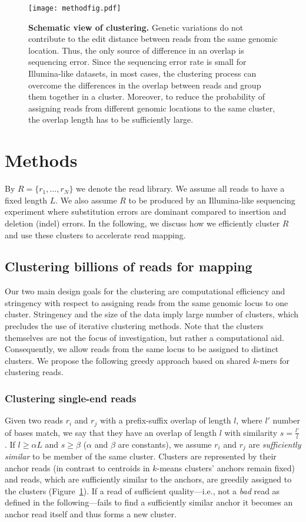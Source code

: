 \documentclass[a4paper]{article}
\begin{document}
\begin{figure}
\centering
\texttt{[image: methodfig.pdf]}
\caption{\label{fig:method}
{\bf Schematic view of clustering.}
Genetic variations do not contribute to the edit distance between reads from the same genomic
location. Thus, the only source of difference in an overlap is sequencing error. Since the sequencing
error rate is small for Illumina-like datasets, in most cases, the clustering process can overcome
the differences in the overlap between reads and group them together in a cluster. Moreover, to
reduce the probability of assigning reads from different genomic locations to the same cluster,
the overlap length has to be sufficiently large.}
\vspace{-4mm}
\end{figure}




\section{Methods}
By $R = \{r_1, \ldots, r_N\}$ we denote the read library.
We assume all reads to have a fixed length $L$.
We also assume $R$ to be produced by an Illumina-like sequencing experiment where
substitution errors are dominant compared to insertion and deletion (indel)
errors. In the following, we discuss how we efficiently cluster $R$
and use these clusters to accelerate read mapping.

\subsection{Clustering billions of reads for mapping}
\label{clustering}
Our two main design goals for the clustering are computational efficiency
and stringency with respect to
assigning reads from the same genomic locus
to one cluster. Stringency and the size of the data imply large number of
clusters, which precludes the use of iterative clustering methods. Note
that the clusters themselves are not the focus of investigation, but rather a
computational aid. Consequently, we allow reads from the same locus to be
assigned to distinct clusters. We propose the following greedy approach based
on shared $k$-mers for clustering reads.

\subsubsection{Clustering single-end reads}
Given two reads $r_i$ and $r_j$ with a prefix-suffix overlap of length $l$,
where $l'$ number of bases match, we say that they have an overlap of
length $l$ with similarity $s = \frac{l'}{l}$.
If $l \ge \alpha L$ and $s \ge \beta$ ($\alpha$ and $\beta$ are constants),
we assume $r_i$ and $r_j$ are \emph{sufficiently similar} to be member of
the same cluster. Clusters are represented by their anchor reads (in
contrast to centroids in $k$-means clusters' anchors remain fixed) and reads,
which are sufficiently similar to the anchors, are greedily assigned to the clusters (Figure~\ref{fig:method}).
If a read of sufficient quality---i.e., not a
{\em bad}
read as defined in the following---fails to
find a sufficiently similar anchor it becomes an anchor read itself and
thus forms a new cluster.
\end{document}
